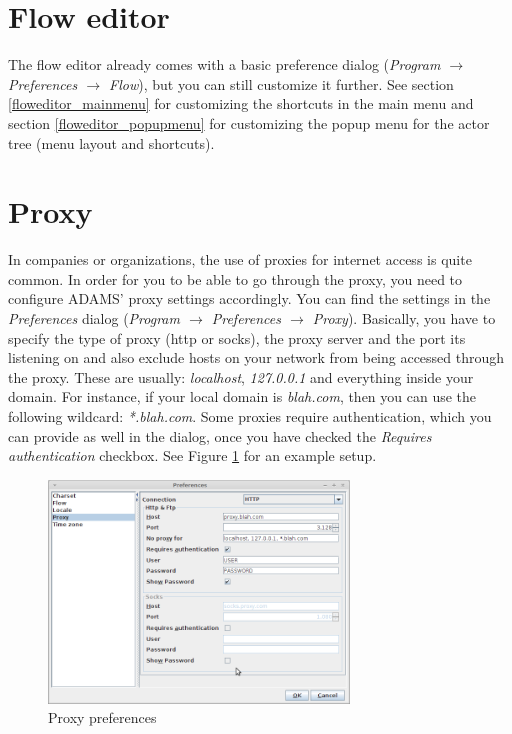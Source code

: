 \section{Flow editor}
The flow editor already comes with a basic preference dialog (\textit{Program 
$\rightarrow$ Preferences $\rightarrow$ Flow}), but you can still customize it further.
See section \ref{floweditor_mainmenu} for customizing the shortcuts in the 
main menu and section \ref{floweditor_popupmenu} for customizing the popup
menu for the actor tree (menu layout and shortcuts).

\section{Proxy}
In companies or organizations, the use of proxies for internet access is quite
common. In order for you to be able to go through the proxy, you need to 
configure ADAMS' proxy settings accordingly. You can find the settings in the
\textit{Preferences} dialog (\textit{Program $\rightarrow$ Preferences $\rightarrow$ Proxy}).
Basically, you have to specify the type of proxy (http or socks), the proxy server 
and the port its listening on and also exclude hosts on your network from being 
accessed through the proxy. These are usually: \textit{localhost}, \textit{127.0.0.1} 
and everything inside your domain. For instance, if your local domain is 
\textit{blah.com}, then you can use the following wildcard: \textit{*.blah.com}. 
Some proxies require authentication, which you can provide as well in the dialog,
once you have checked the \textit{Requires authentication} checkbox.
See Figure \ref{proxy_setup} for an example setup.

\begin{figure}[htb]
  \centering
  \includegraphics[width=8.0cm]{images/proxy_setup.png}
  \caption{Proxy preferences}
  \label{proxy_setup}
\end{figure}


